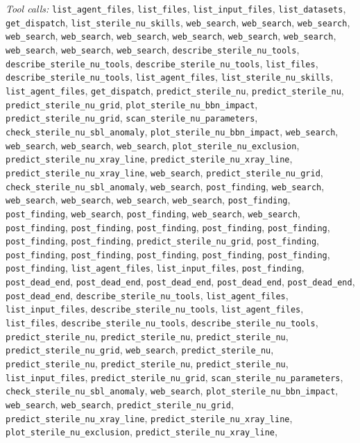 \documentclass[11pt,a4paper]{article}
\begin{document}
\textit{Tool calls:} \texttt{list\_agent\_files}, \texttt{list\_files}, \texttt{list\_input\_files}, \texttt{list\_datasets}, \texttt{get\_dispatch}, \texttt{list\_sterile\_nu\_skills}, \texttt{web\_search}, \texttt{web\_search}, \texttt{web\_search}, \texttt{web\_search}, \texttt{web\_search}, \texttt{web\_search}, \texttt{web\_search}, \texttt{web\_search}, \texttt{web\_search}, \texttt{web\_search}, \texttt{web\_search}, \texttt{web\_search}, \texttt{describe\_sterile\_nu\_tools}, \texttt{describe\_sterile\_nu\_tools}, \texttt{describe\_sterile\_nu\_tools}, \texttt{list\_files}, \texttt{describe\_sterile\_nu\_tools}, \texttt{list\_agent\_files}, \texttt{list\_sterile\_nu\_skills}, \texttt{list\_agent\_files}, \texttt{get\_dispatch}, \texttt{predict\_sterile\_nu}, \texttt{predict\_sterile\_nu}, \texttt{predict\_sterile\_nu\_grid}, \texttt{plot\_sterile\_nu\_bbn\_impact}, \texttt{predict\_sterile\_nu\_grid}, \texttt{scan\_sterile\_nu\_parameters}, \texttt{check\_sterile\_nu\_sbl\_anomaly}, \texttt{plot\_sterile\_nu\_bbn\_impact}, \texttt{web\_search}, \texttt{web\_search}, \texttt{web\_search}, \texttt{web\_search}, \texttt{plot\_sterile\_nu\_exclusion}, \texttt{predict\_sterile\_nu\_xray\_line}, \texttt{predict\_sterile\_nu\_xray\_line}, \texttt{predict\_sterile\_nu\_xray\_line}, \texttt{web\_search}, \texttt{predict\_sterile\_nu\_grid}, \texttt{check\_sterile\_nu\_sbl\_anomaly}, \texttt{web\_search}, \texttt{post\_finding}, \texttt{web\_search}, \texttt{web\_search}, \texttt{web\_search}, \texttt{web\_search}, \texttt{web\_search}, \texttt{post\_finding}, \texttt{post\_finding}, \texttt{web\_search}, \texttt{post\_finding}, \texttt{web\_search}, \texttt{web\_search}, \texttt{post\_finding}, \texttt{post\_finding}, \texttt{post\_finding}, \texttt{post\_finding}, \texttt{post\_finding}, \texttt{post\_finding}, \texttt{post\_finding}, \texttt{predict\_sterile\_nu\_grid}, \texttt{post\_finding}, \texttt{post\_finding}, \texttt{post\_finding}, \texttt{post\_finding}, \texttt{post\_finding}, \texttt{post\_finding}, \texttt{post\_finding}, \texttt{list\_agent\_files}, \texttt{list\_input\_files}, \texttt{post\_finding}, \texttt{post\_dead\_end}, \texttt{post\_dead\_end}, \texttt{post\_dead\_end}, \texttt{post\_dead\_end}, \texttt{post\_dead\_end}, \texttt{post\_dead\_end}, \texttt{describe\_sterile\_nu\_tools}, \texttt{list\_agent\_files}, \texttt{list\_input\_files}, \texttt{describe\_sterile\_nu\_tools}, \texttt{list\_agent\_files}, \texttt{list\_files}, \texttt{describe\_sterile\_nu\_tools}, \texttt{describe\_sterile\_nu\_tools}, \texttt{predict\_sterile\_nu}, \texttt{predict\_sterile\_nu}, \texttt{predict\_sterile\_nu}, \texttt{predict\_sterile\_nu\_grid}, \texttt{web\_search}, \texttt{predict\_sterile\_nu}, \texttt{predict\_sterile\_nu}, \texttt{predict\_sterile\_nu}, \texttt{predict\_sterile\_nu}, \texttt{list\_input\_files}, \texttt{predict\_sterile\_nu\_grid}, \texttt{scan\_sterile\_nu\_parameters}, \texttt{check\_sterile\_nu\_sbl\_anomaly}, \texttt{web\_search}, \texttt{plot\_sterile\_nu\_bbn\_impact}, \texttt{web\_search}, \texttt{web\_search}, \texttt{predict\_sterile\_nu\_grid}, \texttt{predict\_sterile\_nu\_xray\_line}, \texttt{predict\_sterile\_nu\_xray\_line}, \texttt{plot\_sterile\_nu\_exclusion}, \texttt{predict\_sterile\_nu\_xray\_line}, 
\end{document}
